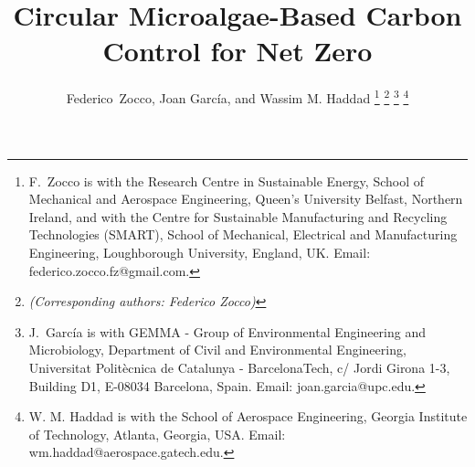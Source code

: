 \documentclass[lettersize,journal]{IEEEtran}
\begin{document}
\title{Circular Microalgae-Based Carbon Control for Net Zero}

\author{Federico~Zocco, Joan Garc\'ia, and Wassim M. Haddad
\thanks{F.~Zocco is with the Research Centre in Sustainable Energy, School of Mechanical and Aerospace Engineering, Queen's University Belfast, Northern Ireland, and with the Centre for Sustainable Manufacturing and Recycling Technologies (SMART), School of Mechanical, Electrical and Manufacturing Engineering, Loughborough University, England, UK. Email: federico.zocco.fz@gmail.com.}
\thanks{\emph{(Corresponding authors: Federico Zocco)}}%
\thanks{J.~Garc\'ia is with GEMMA - Group of Environmental Engineering and Microbiology, Department of Civil and Environmental Engineering, Universitat Polit\`ecnica de Catalunya - BarcelonaTech,
c/ Jordi Girona 1-3, Building D1, E-08034 Barcelona, Spain. Email: joan.garcia@upc.edu.}
\thanks{W. M. Haddad is with the School of Aerospace Engineering, Georgia Institute of Technology, Atlanta, Georgia, USA. Email: wm.haddad@aerospace.gatech.edu.}}















\maketitle
\end{document}
